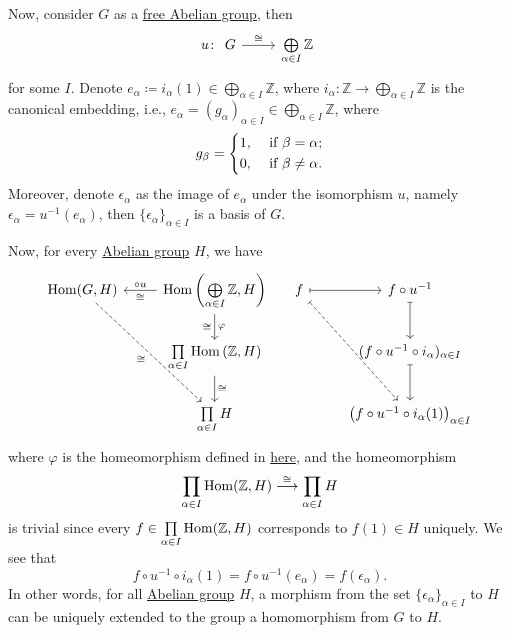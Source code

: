 Now, consider \(G\) as a \hyperref[def:free-Abelian-group]{free Abelian group}, then
\[
	u\colon \begin{tikzcd}
		G & {\bigoplus\limits_{\alpha\in I} \mathbb{Z}}
		\arrow["\cong", from=1-1, to=1-2]
	\end{tikzcd}
\]
for some \(I\). Denote \(e_\alpha \coloneqq i_\alpha (1)\in \bigoplus_{\alpha \in I}\mathbb{Z} \), where \(i_\alpha \colon \mathbb{Z} \to \bigoplus_{\alpha \in I}\mathbb{Z} \) is the
canonical embedding, i.e., \(e_\alpha = (g_\alpha )_{\alpha \in I}\in \bigoplus_{\alpha \in I}\mathbb{Z} \), where
\[
	g_\beta = \begin{dcases}
		1, & \text{ if } \beta = \alpha;    \\
		0, & \text{ if } \beta \neq \alpha.
	\end{dcases}
\]
Moreover, denote \(\epsilon _\alpha \) as the image of \(e_\alpha \) under the isomorphism \(u\), namely \(\epsilon _\alpha = u^{-1} (e_\alpha )\), then \(\{\epsilon _\alpha \}_{\alpha \in I}\) is a basis of \(G\).

Now, for every \hyperref[def:Abelian-group]{Abelian group} \(H\), we have
\[
	\begin{tikzcd}[column sep=small]
		{\Hom(G, H)} && {\Hom\left(\bigoplus\limits_{\alpha\in I}\mathbb{Z}, H\right)} & f && {f\circ u^{-1}} \\
		&& {\prod\limits_{\alpha\in I}\Hom\left(\mathbb{Z}, H\right)} &&& {(f\circ u^{-1}\circ i_{\alpha})_{\alpha\in I}} \\
		&& {\prod\limits_{\alpha\in I}H} &&& {\left(f\circ u^{-1}\circ i_\alpha(1)\right)_{\alpha\in I}}
		\arrow[maps to, from=1-6, to=2-6]
		\arrow[maps to, from=2-6, to=3-6]
		\arrow[dashed, maps to, from=1-4, to=3-6]
		\arrow[maps to, from=1-4, to=1-6]
		\arrow["\varphi", from=1-3, to=2-3]
		\arrow["\cong", from=2-3, to=3-3]
		\arrow["{\circ u}"', from=1-3, to=1-1]
		\arrow["\cong"', dashed, from=1-1, to=3-3]
		\arrow["\cong"', draw=none, from=1-3, to=2-3]
		\arrow["\cong"', draw=none, from=1-1, to=1-3]
	\end{tikzcd}
\]
where \(\varphi\) is the homeomorphism defined in \hyperref[rmk:relation-between-direct-sum-and-direct-product]{here}, and the homeomorphism
\[
	\prod\limits_{\alpha \in I}\operatorname{Hom} (\mathbb{Z} , H) \overset{\cong}{\longrightarrow} \prod\limits_{\alpha \in I}H
\]
is trivial since every \(f\in \prod\limits_{\alpha \in I}\operatorname{Hom} (\mathbb{Z} , H)\) corresponds to \(f(1)\in H\) uniquely. We see that
\[
	f\circ u^{-1} \circ i_\alpha (1) = f\circ u^{-1} (e_\alpha )= f(\epsilon _\alpha ).
\]
In other words, for all \hyperref[def:Abelian-group]{Abelian group} \(H\), a morphism from the set \(\{\epsilon _\alpha \}_{\alpha \in I}\) to \(H\) can be uniquely extended to the group
a homomorphism from \(G\) to \(H\).

